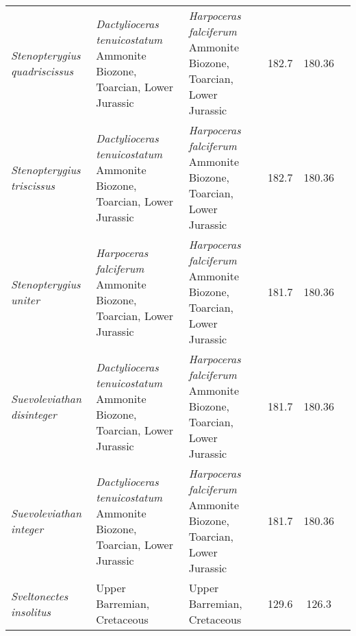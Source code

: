 \begin{longtabu}{>{\itshape}lXXSSl}
	Stenopterygius quadriscissus                         & \emph{Dactylioceras tenuicostatum} Ammonite Biozone, Toarcian, Lower Jurassic                                                      & \emph{Harpoceras falciferum} Ammonite Biozone, Toarcian, Lower Jurassic                                                            & 182.7                    & 180.36                   & \cite{Maisch2008b,Maxwell2012} \\        
	Stenopterygius triscissus                            & \emph{Dactylioceras tenuicostatum} Ammonite Biozone, Toarcian, Lower Jurassic                                                      & \emph{Harpoceras falciferum} Ammonite Biozone, Toarcian, Lower Jurassic                                                            & 182.7                    & 180.36                   & \cite{Maisch2008b,Maxwell2012} \\        
	Stenopterygius uniter                                & \emph{Harpoceras falciferum} Ammonite Biozone, Toarcian, Lower Jurassic                                                            & \emph{Harpoceras falciferum} Ammonite Biozone, Toarcian, Lower Jurassic                                                            & 181.7                    & 180.36                   & \cite{Maisch2008b,Maxwell2012} \\        
	Suevoleviathan disinteger                            & \emph{Dactylioceras tenuicostatum} Ammonite Biozone, Toarcian, Lower Jurassic                                                      & \emph{Harpoceras falciferum} Ammonite Biozone, Toarcian, Lower Jurassic                                                            & 181.7                    & 180.36                   & \cite{Huene1922b,Maisch1998} \\          
	Suevoleviathan integer                               & \emph{Dactylioceras tenuicostatum} Ammonite Biozone, Toarcian, Lower Jurassic                                                      & \emph{Harpoceras falciferum} Ammonite Biozone, Toarcian, Lower Jurassic                                                            & 181.7                    & 180.36                   & \cite{Huene1922b,Maisch1998} \\          
	Sveltonectes insolitus                               & Upper Barremian, Cretaceous                                                                                                        & Upper Barremian, Cretaceous                                                                                                        & 129.6                    & 126.3                    & \cite{Fischer2011c} \\                   

\end{longtabu}
